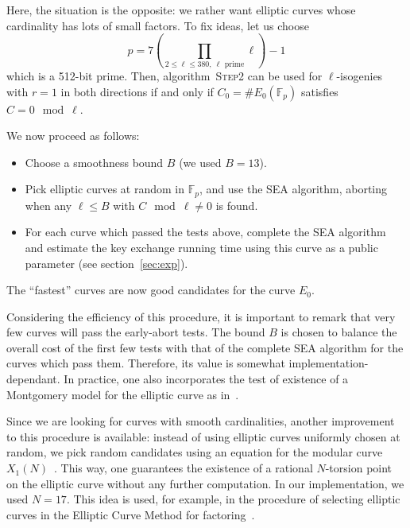 \documentclass{article}
\newcommand{\F}{\mathbb{F}}
\newcommand{\algstyle}[1]{\textsc{#1}}
\theoremstyle{definition}
\begin{document}
Here, the situation is the opposite: we rather want elliptic curves
whose cardinality has lots of small factors. To fix ideas, let us choose
\[
p = 7 \left(\prod_{2\leq\ell\leq 380,\ \ell \text{ prime}} \ell\right) - 1
\]
which is a 512-bit prime. Then, algorithm~\algstyle{Step2} can be used
for $\ell$-isogenies with $r=1$ in both directions if and only if
$C_0 = \# E_0(\F_p)$ satisfies $C=0\mod\ell$.

We now proceed as follows:
\begin{itemize}
\item Choose a smoothness bound $B$ (we used $B = 13$).
\item Pick elliptic curves at random in $\F_p$, and use the SEA
algorithm, aborting when any $\ell\leq B$ with $C\mod\ell\neq 0$
is found.
\item For each curve which passed the tests above, complete the SEA
algorithm and estimate the key exchange running time using this
curve as a public parameter (see section~\ref{sec:exp}).
\end{itemize}
The ``fastest'' curves are now good candidates for the curve $E_0$.

Considering the efficiency of this procedure, it is important to remark
that very few curves will pass the early-abort tests. The bound $B$ is
chosen to balance the overall cost of the first few tests with that of
the complete SEA algorithm for the curves which pass them. Therefore,
its value is somewhat implementation-dependant. In practice, one also
incorporates the test of existence of a Montgomery model for the
elliptic curve as in~\cite{todo:refMontgomery}.

Since we are looking for curves with smooth cardinalities, another
improvement to this procedure is available: instead of using elliptic
curves uniformly chosen at random, we pick random candidates using
an equation for the modular curve $X_1(N)$~\cite{sutherland2012constructing}.
This way, one guarantees the existence of a rational $N$-torsion point
on the elliptic curve without any further computation. In our
implementation, we used $N = 17$. This idea is used, for example,
in the procedure of selecting elliptic curves in the Elliptic Curve Method
for factoring~\cite{todo:refECM}.
\end{document}
